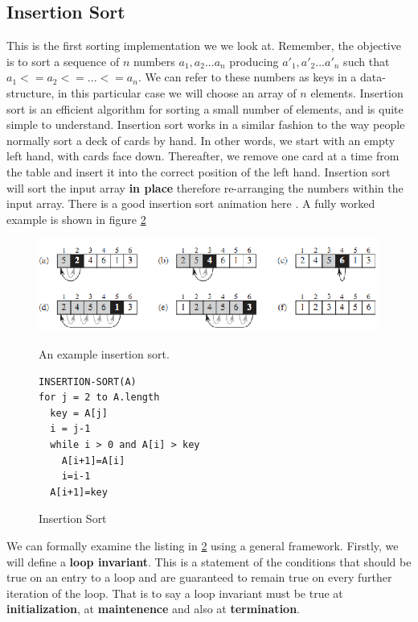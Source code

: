 \documentclass[10pt,a4paper]{article}
\begin{document}
\subsection{Insertion Sort}
This is the first sorting implementation we we look at. Remember, the objective is to sort a sequence of $n$ numbers $a_1,a_2...a_n$ producing $a'_1,a'_2...a'_n$ such that $a_1 <= a_2 <= ... <= a_n$. We can refer to these numbers as keys in a data-structure, in this particular case we will choose an array of $n$ elements. Insertion sort is an efficient algorithm for sorting a small number of elements, and is quite simple to understand. 
\newline\newline
Insertion sort works in a similar fashion to the way people normally sort a deck of cards by hand. In other words, we start with an empty left hand, with cards face down. Thereafter, we remove one card at a time from the table and insert it into the correct position of the left hand. Insertion sort will sort the input array {\bf in place} therefore re-arranging the numbers within the input array. There is a good insertion sort animation here \cite{INSANIM}. A fully worked example is shown in figure \ref{insertionlisting}
\begin{figure}
\caption{An example insertion sort.\cite{INTROALG}}
\begin{center}
\includegraphics[scale=0.43]{../images/insertion.png}
\label{insertion}
\end{center}
\end{figure}
\begin{figure}
\caption{Insertion Sort}
\begin{center}
\begin{lstlisting}
INSERTION-SORT(A)
for j = 2 to A.length
  key = A[j]
  i = j-1
  while i > 0 and A[i] > key
    A[i+1]=A[i]
    i=i-1
  A[i+1]=key
\end{lstlisting}
\label{insertionlisting}
\end{center}
\end{figure}
We can formally examine the listing in \ref{insertionlisting} using a general framework. Firstly, we will define a {\bf loop invariant}. This is a statement of the conditions that should be true on an entry to a loop and are guaranteed to remain true on every further iteration of the loop. That is to say a loop invariant must be true at {\bf initialization}, at {\bf maintenence} and also at {\bf termination}.
\end{document}
